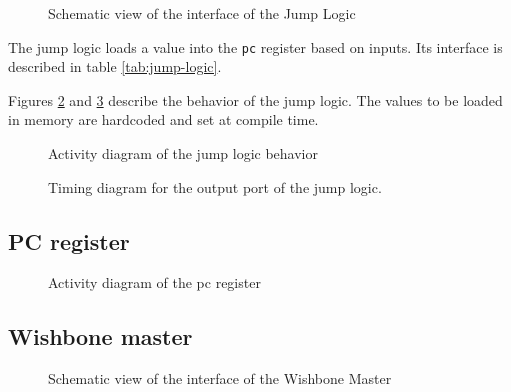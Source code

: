 \begin{figure}[H]
    \centering
    
    \caption{Schematic view of the interface of the Jump Logic}
    \label{fig:jump-logic}
\end{figure}

\begin{content}
  The jump logic loads a value into the \texttt{pc} register based on inputs. Its interface is described in table \ref{tab:jump-logic}.
\end{content}



\begin{content}
\end{content}

\begin{content}
  Figures \ref{fig:jump-logic-behavior} and \ref{fig:jump-logic-output} describe the behavior of the jump logic. The values to be loaded in memory are hardcoded and set at compile time.
\end{content}

\begin{figure}[H]
    \centering
    
    \caption{Activity diagram of the jump logic behavior}
    \label{fig:jump-logic-behavior}
\end{figure}

\begin{figure}[H]
    \centering
    
    \caption{Timing diagram for the output port of the jump logic.}
    \label{fig:jump-logic-output}
\end{figure}

\subsection{PC register}

\begin{figure}[H]
    \centering
    
    \caption{Activity diagram of the pc register}
    \label{fig:pc-behavior}
\end{figure}

\subsection{Wishbone master}

\begin{figure}[H]
    \centering
    
    \caption{Schematic view of the interface of the Wishbone Master}
    \label{fig:ifm-wishbone-master}
\end{figure}


